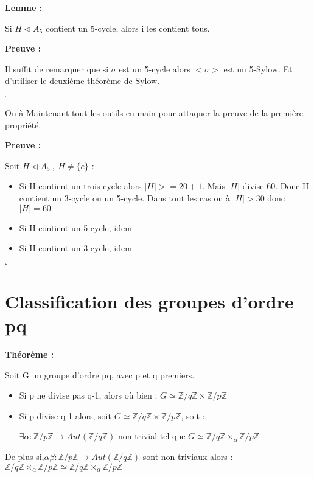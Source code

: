 \documentclass{report}
\renewenvironment{leftbar}{%
  \def\FrameCommand{\vrule width 0.4pt \hspace{10pt}}%
  \MakeFramed {\advance\hsize-\width \FrameRestore}}%
 {\endMakeFramed}%
\newenvironment{preuve}{\vspace*{0.5cm}
    \begin{leftbar}
    \noindent\textbf{Preuve :}\par}{
    \begin{flushright}
    $\square$
    \end{flushright}
    \end{leftbar}
}
\newenvironment{lemme}[2][white]{\begin{tcolorbox}[colframe= #1]
    \textbf{Lemme :} #2  \par}
    {\end{tcolorbox}}
\newenvironment{theoreme}[1][]{
    \begin{tcolorbox}[]
    \textbf{Théorème :} #1  \par} 
    {\end{tcolorbox}}
\newcommand{\Z}{\mathbb{Z}}
\newcommand{\dsp}{\displaystyle}
\begin{document}
\begin{lemme}{}
Si $H\triangleleft A_{5}$ contient un 5-cycle, alors i les contient tous.
\end{lemme}

\begin{preuve}
Il suffit de remarquer que si $\sigma$ est un 5-cycle alors $<\sigma>$ est un 5-Sylow. Et d'utiliser le deuxième théorème de Sylow.
\end{preuve}

On à Maintenant tout les outils en main pour attaquer la preuve de la première propriété.




\begin{preuve}
Soit $H\triangleleft A_{5}~,~ H\neq \{e\}$ :

\begin{itemize}
\item Si H contient un trois cycle alors $|H|>= 20+1$. Mais $|H|$ divise 60. Donc H contient un 3-cycle ou un 5-cycle. Dans tout les cas on à $|H|>30$ donc $|H|=60$
\item Si H contient un 5-cycle, idem
\item Si H contient un 3-cycle, idem
\end{itemize}

\end{preuve}







\section{Classification des groupes d'ordre pq}


\begin{theoreme}
Soit G un groupe d'ordre pq, avec p et q premiers.
\begin{itemize}[label = -]
\item Si p ne divise pas q-1, alors où bien : $\dsp G \simeq \Z/q\Z \times \Z/p\Z$
\item Si p divise q-1 alors, soit $\dsp G \simeq \Z/q\Z \times \Z/p\Z$, soit :\par
	$\exists \alpha : \Z/p\Z \longrightarrow Aut(\Z/q\Z)$ non trivial tel que $G \simeq \Z/q\Z \times_{\alpha} \Z/p\Z$
\end{itemize}

De plus si,$\alpha \beta : \Z/p\Z \longrightarrow Aut(\Z/q\Z) $ sont non triviaux alors : $\Z/q\Z \times_{\alpha} \Z/p\Z \simeq \Z/q\Z \times_{\alpha} \Z/p\Z $

\end{theoreme}
\end{document}
